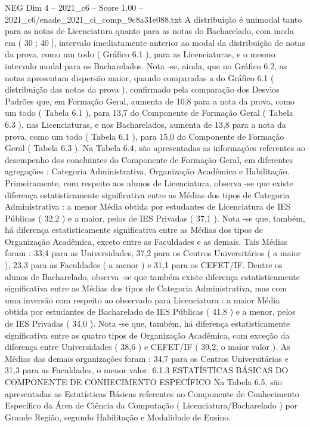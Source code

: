 \begin{textsample}{NEG Dim 4 – 2021\_c6 – Score 1.00 – 2021\_c6/enade\_2021\_ci\_comp\_9c8a31e088.txt}
A distribuição é unimodal tanto para as notas de Licenciatura quanto para as notas do Bacharelado, com moda em ( 30 ; 40 ], intervalo imediatamente anterior ao modal da distribuição de notas da prova, como um todo ( Gráfico 6.1 ), para as Licenciaturas, e o mesmo intervalo modal para os Bacharelados.
Nota -se, ainda, que no Gráfico 6.2, as notas apresentam dispersão maior, quando comparadas a do Gráfico 6.1 ( distribuição das notas da prova ), confirmado pela comparação dos Desvios Padrões que, em Formação Geral, aumenta de 10,8 para a nota da prova, como um todo ( Tabela 6.1 ), para 13,7 do Componente de Formação Geral ( Tabela 6.3 ), nas Licenciaturas, e nos Bacharelados, aumenta de 13,8 para a nota da prova, como um todo ( Tabela 6.1 ), para 15,0 do Componente de Formação Geral ( Tabela 6.3 ).
Na Tabela 6.4, são apresentadas as informações referentes ao desempenho dos concluintes do Componente de Formação Geral, em diferentes agregações : Categoria Administrativa, Organização Acadêmica e Habilitação.
Primeiramente, com respeito aos alunos de Licenciatura, observa -se que existe diferença estatisticamente significativa entre as Médias dos tipos de Categoria Administrativa : a menor Média obtida por estudantes de Licenciatura de IES Públicas ( 32,2 ) e a maior, pelos de IES Privadas ( 37,1 ).
Nota -se que, também, há diferença estatisticamente significativa entre as Médias dos tipos de Organização Acadêmica, exceto entre as Faculdades e as demais.
Tais Médias foram : 33,4 para as Universidades, 37,2 para os Centros Universitários ( a maior ), 23,3 para as Faculdades ( a menor ) e 31,1 para os CEFET/IF.
Dentre os alunos de Bacharelado, observa -se que também existe diferença estatisticamente significativa entre as Médias dos tipos de Categoria Administrativa, mas com uma inversão com respeito ao observado para Licenciatura : a maior Média obtida por estudantes de Bacharelado de IES Públicas ( 41,8 ) e a menor, pelos de IES Privadas ( 34,0 ).
Nota -se que, também, há diferença estatisticamente significativa entre as quatro tipos de Organização Acadêmica, com exceção da diferença entre Universidades ( 38,6 ) e CEFET/IF ( 39,2, o maior valor ).
As Médias das demais organizações foram : 34,7 para os Centros Universitários e 31,3 para as Faculdades, o menor valor. 6.1.3 ESTATÍSTICAS BÁSICAS DO COMPONENTE DE CONHECIMENTO ESPECÍFICO Na Tabela 6.5, são apresentadas as Estatísticas Básicas referentes ao Componente de Conhecimento Específico da Área de Ciência da Computação ( Licenciatura/Bacharelado ) por Grande Região, segundo Habilitação e Modalidade de Ensino.

\end{textsample}
